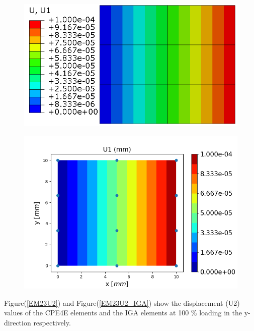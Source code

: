 \documentclass[12pt]{article}
\begin{document}
\begin{figure}[H]
	\centering
	\begin{minipage}{.5\textwidth}
		\centering
		\includegraphics[width=1\linewidth]{EM23U1.png}
		\label{EM23U1}
	\end{minipage}%
	\begin{minipage}{.6\textwidth}
		\centering
		\includegraphics[width=1\linewidth]{EM23U1_IGA.png}
		\label{EM23U1_IGA}
	\end{minipage}
\end{figure}
\noindent
Figure(\ref{EM23U2}) and Figure(\ref{EM23U2_IGA}) show the displacement (U2) values of the CPE4E elements and the IGA elements at 100 \% loading in the y-direction respectively. \\
\end{document}
